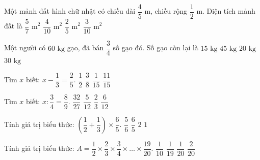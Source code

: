 \begin{ex} %
Một mảnh đất hình chữ nhật có chiều dài $\dfrac{4}{5}\text{ m}$, chiều rộng $\dfrac{1}{2}\text{ m}$. Diện tích mảnh đất là
\choice
{$\dfrac{5}{7}\text{ m}^2$}
{$\dfrac{4}{10}\text{ m}^2$}
{\True $\dfrac{2}{5}\text{ m}^2$}
{$\dfrac{3}{10}\text{ m}^2$}
\end{ex}

\begin{ex} %
Một người có $60\text{ kg}$ gạo, đã bán $\dfrac{3}{4}$ số gạo đó. Số gạo còn lại là
\choice
{\True $15\text{ kg}$}
{$45\text{ kg}$}
{$20\text{ kg}$}
{$30\text{ kg}$}
\end{ex}

\begin{ex} %
Tìm $x$ biết: $x - \dfrac{1}{3} = \dfrac{2}{5}$.
\choice
{$\dfrac{1}{2}$}
{$\dfrac{3}{8}$}
{$\dfrac{1}{15}$}
{\True $\dfrac{11}{15}$}
\end{ex}

\begin{ex} %
Tìm $x$ biết: $x : \dfrac{3}{4} = \dfrac{8}{9}$.
\choice
{$\dfrac{32}{27}$}
{$\dfrac{5}{12}$}
{\True $\dfrac{2}{3}$}
{$\dfrac{6}{12}$}
\end{ex}

\begin{ex} %
Tính giá trị biểu thức: $\left(\dfrac{1}{2} + \dfrac{1}{3}\right) \times \dfrac{6}{5}$.
\choice
{$\dfrac{5}{6}$}
{$\dfrac{6}{5}$}
{$2$}
{\True $1$}
\end{ex}

\begin{ex} %
Tính giá trị biểu thức: $A = \dfrac{1}{2} \times \dfrac{2}{3} \times \dfrac{3}{4} \times \dots \times \dfrac{19}{20}$.
\choice
{$\dfrac{1}{10}$}
{$\dfrac{1}{19}$}
{\True $\dfrac{1}{20}$}
{$\dfrac{2}{20}$}
\end{ex}

